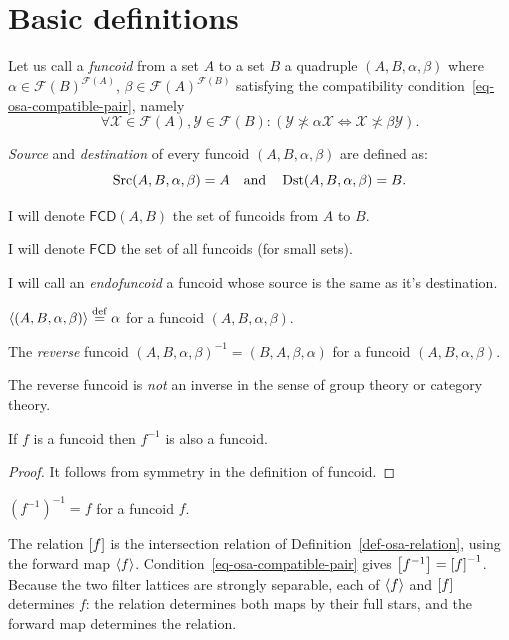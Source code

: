 \section{Basic definitions}
\begin{defn}
Let us call a \emph{funcoid} from a set $A$ to a
set $B$ a quadruple $(A,B,\alpha,\beta)$ where
$\alpha\in\mathscr{F}(B)^{\mathscr{F}(A)}$,
$\beta\in\mathscr{F}(A)^{\mathscr{F}(B)}$ satisfying the compatibility condition~\eqref{eq-osa-compatible-pair}, namely
\[
\forall\mathcal{X}\in\mathscr{F}(A),\mathcal{Y}\in\mathscr{F}(B):(\mathcal{Y}
\nasymp\alpha\mathcal{X}\Leftrightarrow\mathcal{X}\nasymp\beta\mathcal{Y}).
\]

\end{defn}

\begin{defn}
\emph{Source} and
\emph{destination} of every funcoid $(A,B,\alpha,\beta)$ are defined
as:
\[
\operatorname{Src}(A,B,\alpha,\beta)=A\quad\text{and}\quad\operatorname{Dst}(A,B,\alpha,\beta)=B.
\]

\end{defn}
I will denote $\mathsf{FCD}(A,B)$ the set of funcoids from $A$ to
$B$.

I will denote $\mathsf{FCD}$ the set of all funcoids (for small sets).
\begin{defn}
I will call an \emph{endofuncoid} a funcoid whose source is the same as it's destination.
\end{defn}

\begin{defn}
$\left\langle (A,B,\alpha,\beta)\right\rangle\overset{\mathrm{def}}{=}\alpha$ for a funcoid $(A,B,\alpha,\beta)$.
\end{defn}

\begin{defn}
The \emph{reverse} funcoid
$(A,B,\alpha,\beta)^{-1}=(B,A,\beta,\alpha)$
for a funcoid $(A,B,\alpha,\beta)$.\end{defn}
\begin{note}
The reverse funcoid is \emph{not} an inverse in the sense of group
theory or category theory.\end{note}
\begin{prop}
If $f$ is a funcoid then $f^{-1}$ is also a funcoid.\end{prop}
\begin{proof}
It follows from symmetry in the definition of funcoid.\end{proof}
\begin{obvious}
$(f^{-1})^{-1}=f$ for a funcoid $f$.\end{obvious}
The relation $\mathrel{\left[f\right]}$ is the intersection relation of
Definition~\ref{def-osa-relation}, using the forward map $\left\langle f\right\rangle$.
Condition~\eqref{eq-osa-compatible-pair} gives
$\mathord{\mathrel{\left[f^{-1}\right]}}=\mathord{\mathrel{\left[f\right]}}^{-1}$. Because the two
filter lattices are strongly separable, each of $\left\langle f\right\rangle$ and
$\mathrel{\left[f\right]}$ determines $f$: the relation determines both maps by
their full stars, and the forward map determines the relation.

